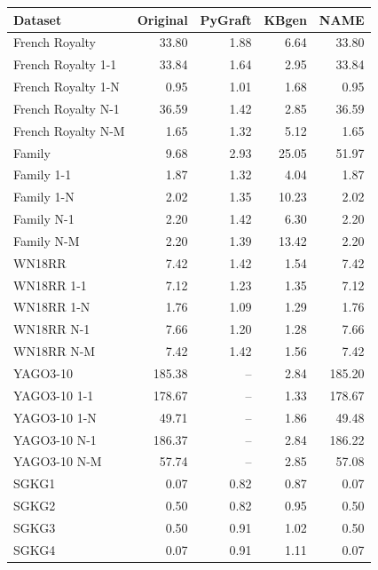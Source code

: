\begin{tabular}{lrrrr}
\toprule
Dataset & Original & PyGraft & KBgen & NAME \\
\midrule
French Royalty & 33.80 & 1.88 & 6.64 & 33.80 \\
French Royalty 1-1 & 33.84 & 1.64 & 2.95 & 33.84 \\
French Royalty 1-N & 0.95 & 1.01 & 1.68 & 0.95 \\
French Royalty N-1 & 36.59 & 1.42 & 2.85 & 36.59 \\
French Royalty N-M & 1.65 & 1.32 & 5.12 & 1.65 \\
\midrule
Family & 9.68 & 2.93 & 25.05 & 51.97 \\
Family 1-1 & 1.87 & 1.32 & 4.04 & 1.87 \\
Family 1-N & 2.02 & 1.35 & 10.23 & 2.02 \\
Family N-1 & 2.20 & 1.42 & 6.30 & 2.20 \\
Family N-M & 2.20 & 1.39 & 13.42 & 2.20 \\
\midrule
WN18RR & 7.42 & 1.42 & 1.54 & 7.42 \\
WN18RR 1-1 & 7.12 & 1.23 & 1.35 & 7.12 \\
WN18RR 1-N & 1.76 & 1.09 & 1.29 & 1.76 \\
WN18RR N-1 & 7.66 & 1.20 & 1.28 & 7.66 \\
WN18RR N-M & 7.42 & 1.42 & 1.56 & 7.42 \\
\midrule
YAGO3-10 & 185.38 & – & 2.84 & 185.20 \\
YAGO3-10 1-1 & 178.67 & – & 1.33 & 178.67 \\
YAGO3-10 1-N & 49.71 & – & 1.86 & 49.48 \\
YAGO3-10 N-1 & 186.37 & – & 2.84 & 186.22 \\
YAGO3-10 N-M & 57.74 & – & 2.85 & 57.08 \\
\midrule
SGKG1 & 0.07 & 0.82 & 0.87 & 0.07 \\
SGKG2 & 0.50 & 0.82 & 0.95 & 0.50 \\
SGKG3 & 0.50 & 0.91 & 1.02 & 0.50 \\
SGKG4 & 0.07 & 0.91 & 1.11 & 0.07 \\
\bottomrule
\end{tabular}
